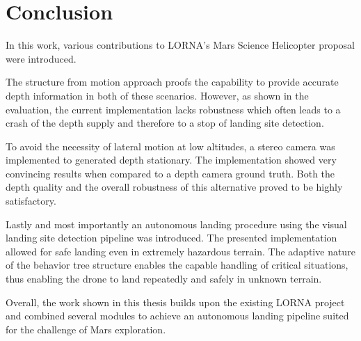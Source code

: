 \chapter{Conclusion}
\label{sec:conclusion}

In this work, various contributions to LORNA's Mars Science Helicopter proposal were introduced.

The structure from motion approach proofs the capability to provide accurate depth information in both of these scenarios. However, as shown in the evaluation, the current implementation lacks robustness which often leads to a crash of the depth supply and therefore to a stop of landing site detection. 

To avoid the necessity of lateral motion at low altitudes, a stereo camera was implemented to generated depth stationary. The implementation showed very convincing results when compared to a depth camera ground truth. Both the depth quality and the overall robustness of this alternative proved to be highly satisfactory.

Lastly and most importantly an autonomous landing procedure using the visual landing site detection pipeline was introduced. The presented implementation allowed for safe landing even in extremely hazardous terrain. The adaptive nature of the behavior tree structure enables the capable handling of critical situations, thus enabling the drone to land repeatedly and safely in unknown terrain.

Overall, the work shown in this thesis builds upon the existing LORNA project and combined several modules to achieve an autonomous landing pipeline suited for the challenge of Mars exploration. 
